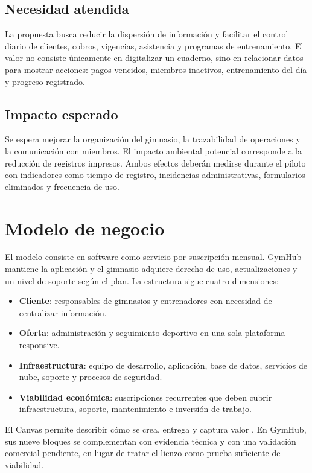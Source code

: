 \subsection{Necesidad atendida}

La propuesta busca reducir la dispersión de información y facilitar el control
diario de clientes, cobros, vigencias, asistencia y programas de entrenamiento.
El valor no consiste únicamente en digitalizar un cuaderno, sino en relacionar
datos para mostrar acciones: pagos vencidos, miembros inactivos, entrenamiento
del día y progreso registrado.

\subsection{Impacto esperado}

Se espera mejorar la organización del gimnasio, la trazabilidad de operaciones y
la comunicación con miembros. El impacto ambiental potencial corresponde a la
reducción de registros impresos. Ambos efectos deberán medirse durante el piloto
con indicadores como tiempo de registro, incidencias administrativas, formularios
eliminados y frecuencia de uso.

\section{Modelo de negocio}

El modelo consiste en software como servicio por suscripción mensual. GymHub
mantiene la aplicación y el gimnasio adquiere derecho de uso, actualizaciones y
un nivel de soporte según el plan. La estructura sigue cuatro dimensiones:

\begin{itemize}
  \item \textbf{Cliente}: responsables de gimnasios y entrenadores con necesidad
  de centralizar información.
  \item \textbf{Oferta}: administración y seguimiento deportivo en una sola
  plataforma responsive.
  \item \textbf{Infraestructura}: equipo de desarrollo, aplicación, base de datos,
  servicios de nube, soporte y procesos de seguridad.
  \item \textbf{Viabilidad económica}: suscripciones recurrentes que deben cubrir
  infraestructura, soporte, mantenimiento e inversión de trabajo.
\end{itemize}

El Canvas permite describir cómo se crea, entrega y captura valor
\parencite{osterwalder2010}. En GymHub, sus nueve bloques se complementan con
evidencia técnica y con una validación comercial pendiente, en lugar de tratar el
lienzo como prueba suficiente de viabilidad.

